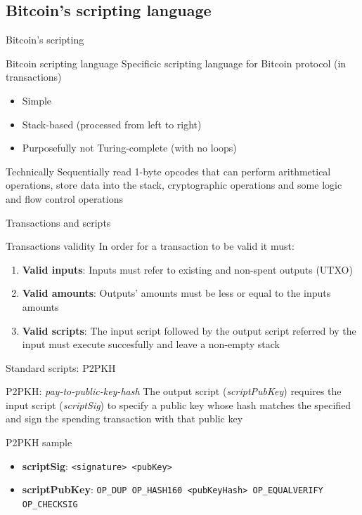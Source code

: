 \documentclass{beamer}
\begin{document}
\subsection{Bitcoin's scripting language}
\begin{frame}{Bitcoin's scripting}
 \begin{block}{Bitcoin scripting language}
  Specificic scripting language for Bitcoin protocol (in transactions)
  \begin{itemize}
   \item Simple
   \item Stack-based (processed from left to right)
   \item Purposefully not Turing-complete (with no loops)
  \end{itemize}
 \end{block}
 \begin{block}{Technically}
  Sequentially read 1-byte opcodes that can perform arithmetical operations, store data into the stack, cryptographic operations and some logic and flow control operations
 \end{block}
\end{frame}
\begin{frame}{Transactions and scripts}
 \begin{block}{Transactions validity}
  In order for a transaction to be valid it must:
  \begin{enumerate}
   \item \textbf{Valid inputs}: Inputs must refer to existing and non-spent outputs (UTXO)
   \item \textbf{Valid amounts}: Outputs' amounts must be less or equal to the inputs amounts
   \item \textbf{Valid scripts}: The input script followed by the output script referred by the input must execute succesfully and leave a non-empty stack
  \end{enumerate}
 \end{block}
\end{frame}
\begin{frame}{Standard scripts: P2PKH}
 \begin{block}{P2PKH: \textit{pay-to-public-key-hash}}
  The output script (\textit{scriptPubKey}) requires the input script (\textit{scriptSig}) to specify a public key whose hash matches the specified and sign the spending transaction with that public key
 \end{block}
 \begin{exampleblock}{P2PKH sample}
  \begin{itemize}
   \item \textbf{scriptSig}: \texttt{<signature> <pubKey>}
   \item \textbf{scriptPubKey}: \texttt{OP\_DUP OP\_HASH160 <pubKeyHash> OP\_EQUALVERIFY OP\_CHECKSIG}
  \end{itemize}
 \end{exampleblock}
\end{frame}
\end{document}
